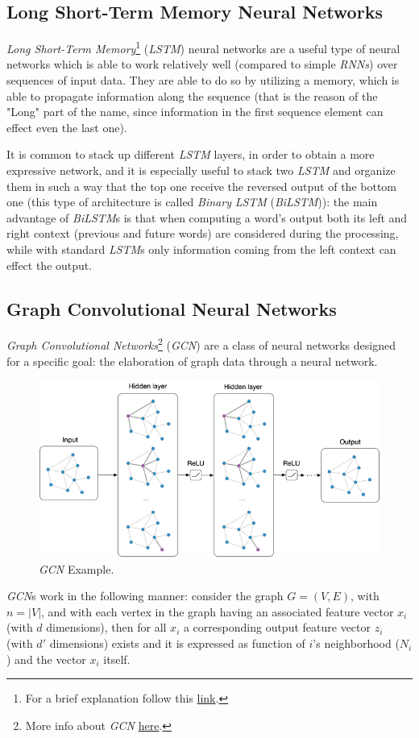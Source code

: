 \documentclass[a4paper,10pt,twocolumn]{article}
\newcommand{\LSTM}{\emph{LSTM}}
\newcommand{\BiLSTM}{\emph{BiLSTM}}
\newcommand{\GCN}{\emph{GCN}}
\begin{document}
\subsection{Long Short-Term Memory Neural Networks}
\label{sec:lstm}
\emph{Long Short-Term Memory}\footnote{For a brief explanation follow this \href{http://colah.github.io/posts/2015-08-Understanding-LSTMs/}{link}.} (\LSTM) neural networks are  a useful type of neural networks which is able to work relatively well (compared to simple \emph{RNNs}) over sequences of input data. They are able to do so by utilizing a memory, which is able to propagate information along the sequence (that is the reason of the "Long" part of the name, since information in the first sequence element can effect even the last one).

It is common to stack up different \LSTM{} layers, in order to obtain a more expressive network, and it is especially useful to stack two \LSTM{} and organize them in such a way that the top one receive the reversed output of the bottom one (this type of architecture is called \emph{Binary} \LSTM{} (\BiLSTM)): the main advantage of \BiLSTM{}s is that when computing a word's output  both its left and right context (previous and future words) are considered during the processing, while with standard \LSTM{}s only information coming from the left context can effect the output.


\subsection{Graph Convolutional Neural Networks}
\label{sec:gcn}
\emph{Graph Convolutional Networks}\footnote{More info about \GCN{} \href{https://tkipf.github.io/graph-convolutional-networks/}{here}.} (\GCN)  are a class of neural networks designed for a specific goal:  the elaboration of graph data through a neural network. 
\begin{figure}[h!]
\caption{\GCN{} Example.}
\label{fig:gcn}
\centering
\includegraphics[width=.4\textwidth]{gcn.png}
\end{figure}

\GCN{}s work in the following manner: consider the graph $G = (V,E)$, with $n = |V|$, and with each vertex in the graph having an associated feature vector $x_i$ (with $d$ dimensions), then for all $x_i$ a corresponding output feature vector $z_i$ (with $d'$ dimensions) exists and it is expressed as function of $i$'s neighborhood ($N_i$)  and the vector $x_i$ itself.
\end{document}
